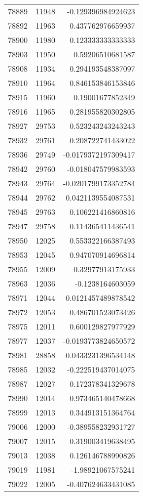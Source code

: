 \begin{tabular}{r | r | r}
78889 & 11948 & -0.129396984924623 \\
78892 & 11963 & 0.437762976659937 \\
78900 & 11980 & 0.123333333333333 \\
78903 & 11950 & 0.59206510681587 \\
78908 & 11934 & 0.294193548387097 \\
78910 & 11964 & 0.846153846153846 \\
78915 & 11960 & 0.19001677852349 \\
78916 & 11965 & 0.281955820302805 \\
78927 & 29753 & 0.523243243243243 \\
78932 & 29761 & 0.208722741433022 \\
78936 & 29749 & -0.0179372197309417 \\
78942 & 29760 & -0.018047579983593 \\
78943 & 29764 & -0.0201799173352784 \\
78944 & 29762 & 0.0421139554087531 \\
78945 & 29763 & 0.106221416860816 \\
78947 & 29758 & 0.114365411436541 \\
78950 & 12025 & 0.553322166387493 \\
78953 & 12045 & 0.947070914696814 \\
78955 & 12009 & 0.32977913175933 \\
78963 & 12036 & -0.1238164603059 \\
78971 & 12044 & 0.0121457489878542 \\
78972 & 12053 & 0.486701523073426 \\
78975 & 12011 & 0.600129827977929 \\
78977 & 12037 & -0.0193773824650572 \\
78981 & 28858 & 0.0433231396534148 \\
78985 & 12032 & -0.222519437014075 \\
78987 & 12027 & 0.172378341329678 \\
78990 & 12014 & 0.973465140478668 \\
78999 & 12013 & 0.344913151364764 \\
79006 & 12000 & -0.389558232931727 \\
79007 & 12015 & 0.319003419638495 \\
79013 & 12038 & 0.126146788990826 \\
79019 & 11981 & -1.98921067575241 \\
79022 & 12005 & -0.407624633431085 \\

\end{tabular}
